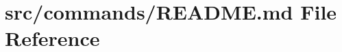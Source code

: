 \hypertarget{src_2commands_2README_8md}{}\section{src/commands/\+R\+E\+A\+D\+ME.md File Reference}
\label{src_2commands_2README_8md}
